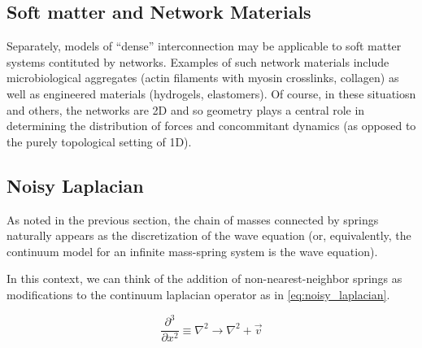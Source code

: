 \documentclass{article}
\begin{document}
\subsection{Soft matter and Network Materials}

Separately, models of ``dense'' interconnection may be applicable to soft matter systems contituted by networks.
Examples of such network materials include microbiological aggregates (actin filaments with myosin crosslinks, collagen) as well as engineered materials (hydrogels, elastomers).
Of course, in these situatiosn and others, the networks are 2D and so geometry plays a central role in determining the distribution of forces and concommitant dynamics (as opposed to the purely topological setting of 1D). 

\subsection{Noisy Laplacian}

As noted in the previous section, the chain of masses connected by springs
naturally appears as the discretization of the wave equation 
(or, equivalently, the continuum model for an infinite mass-spring system is the wave equation).


In this context, we can think of the addition of non-nearest-neighbor springs as modifications to the continuum laplacian operator as in \ref{eq:noisy_laplacian}.

\begin{equation}\label{eq:noisy_laplacian}
	\frac{\partial^3}{\partial x^2} \equiv \nabla^2 \rightarrow \nabla^2 + \vec{v}
\end{equation}
\end{document}
